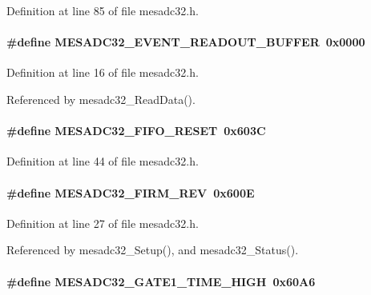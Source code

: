 Definition at line 85 of file mesadc32.h.
\paragraph[{MESADC32\_\-EVENT\_\-READOUT\_\-BUFFER}]{\setlength{\rightskip}{0pt plus 5cm}\#define MESADC32\_\-EVENT\_\-READOUT\_\-BUFFER~0x0000}\hfill\label{mesadc32_8h_aa917184aec8172e49945d231e04d930f}


Definition at line 16 of file mesadc32.h.

Referenced by mesadc32\_\-ReadData().
\paragraph[{MESADC32\_\-FIFO\_\-RESET}]{\setlength{\rightskip}{0pt plus 5cm}\#define MESADC32\_\-FIFO\_\-RESET~0x603C}\hfill\label{mesadc32_8h_ac026a038a7d607cae1115fa86e4b2675}


Definition at line 44 of file mesadc32.h.
\paragraph[{MESADC32\_\-FIRM\_\-REV}]{\setlength{\rightskip}{0pt plus 5cm}\#define MESADC32\_\-FIRM\_\-REV~0x600E}\hfill\label{mesadc32_8h_aa421ef07c0488d0ee1ba88b2f6a5e59b}


Definition at line 27 of file mesadc32.h.

Referenced by mesadc32\_\-Setup(), and mesadc32\_\-Status().
\paragraph[{MESADC32\_\-GATE1\_\-TIME\_\-HIGH}]{\setlength{\rightskip}{0pt plus 5cm}\#define MESADC32\_\-GATE1\_\-TIME\_\-HIGH~0x60A6}\hfill\label{mesadc32_8h_aef72976520e2e56c4d304f9dab2085c3}


